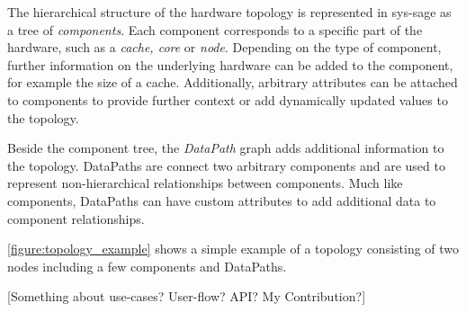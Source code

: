 The hierarchical structure of the hardware topology is represented in sys-sage as a tree of \emph{components}.
Each component corresponds to a specific part of the hardware, such as a \emph{cache, core} or \emph{node}.
Depending on the type of component, further information on the underlying hardware can be added to the component, for example the size of a cache.
Additionally, arbitrary attributes can be attached to components to provide further context or add dynamically updated values to the topology.

Beside the component tree, the \emph{DataPath} graph adds additional information to the topology.
DataPaths are connect two arbitrary components and are used to represent non-hierarchical relationships between components.
Much like components, DataPaths can have custom attributes to add additional data to component relationships.

\autoref{figure:topology_example} shows a simple example of a topology consisting of two nodes including a few components and DataPaths.

[Something about use-cases? User-flow? API? My Contribution?]